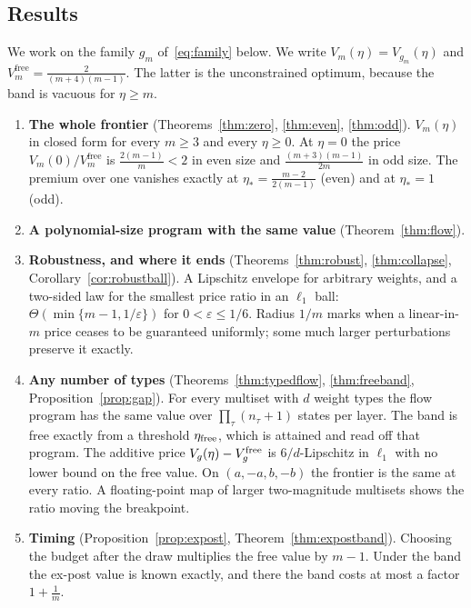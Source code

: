 \subsection{Results}

We work on the family $g_{m}$ of~\eqref{eq:family} below. We write
$V_{m}(\eta)=V_{g_{m}}(\eta)$ and $V^{\mathrm{free}}_{m}=\frac{2}{(m+4)(m-1)}$. The latter is
the unconstrained optimum, because the band is vacuous for $\eta\ge m$.

\begin{enumerate}
\item[1)] \textbf{The whole frontier} (Theorems~\ref{thm:zero}, \ref{thm:even},
\ref{thm:odd}). $V_{m}(\eta)$ in closed form for every $m\ge3$ and every $\eta\ge0$. At
$\eta=0$ the price $V_{m}(0)/V^{\mathrm{free}}_{m}$ is $\frac{2(m-1)}{m}<2$ in even size and
$\frac{(m+3)(m-1)}{2m}$ in odd size. The premium over one vanishes exactly at $\eta_{*}=\frac{m-2}{2(m-1)}$
(even) and at $\eta_{*}=1$ (odd).
\item[2)] \textbf{A polynomial-size program with the same value} (Theorem~\ref{thm:flow}).
\item[3)] \textbf{Robustness, and where it ends} (Theorems~\ref{thm:robust},
\ref{thm:collapse}, Corollary~\ref{cor:robustball}). A Lipschitz envelope for arbitrary
weights, and a two-sided law for the smallest price ratio in an $\ell_1$ ball:
$\Theta(\min\{m-1,1/\varepsilon\})$ for $0<\varepsilon\le1/6$.
Radius $1/m$ marks when a linear-in-$m$ price ceases to be guaranteed uniformly;
some much larger perturbations preserve it exactly.
\item[4)] \textbf{Any number of types} (Theorems~\ref{thm:typedflow}, \ref{thm:freeband},
Proposition~\ref{prop:gap}). For every multiset with $d$ weight types the flow program has the
same value over $\prod_\tau(n_\tau+1)$ states per layer. The band is free exactly from a threshold
$\eta_{\rm free}$, which is attained and read off that program. The additive price
$V_g(\eta)-V^{\rm free}_g$ is $6/d$-Lipschitz in $\ell_1$ with no lower bound on the free value.
On $(a,-a,b,-b)$ the frontier is the same at every ratio. A floating-point map of larger
two-magnitude multisets shows the ratio moving the breakpoint.
\item[5)] \textbf{Timing} (Proposition~\ref{prop:expost}, Theorem~\ref{thm:expostband}).
Choosing the budget after the draw multiplies the free value by $m-1$. Under the band the
ex-post value is known exactly, and there the band costs at most a factor $1+\frac1m$.
\end{enumerate}

